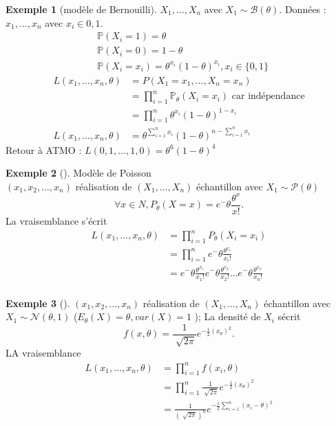 \documentclass{article}
\theoremstyle{plain}%
\theoremstyle{definition}
\newtheorem{exmp}{Exemple}[section]
\theoremstyle{remark}
\begin{document}
\begin{exmp}[modèle de Bernouilli]
    $ X_1, \dots, X_n $ avec $ X_1 \sim \mathcal{B}(\theta ) $. Données : $ x_1, \dots, x_n $ avec $ x_i \in {0,1} $. 
    \begin{align*}
        &\mathbb{P}(X_i=1) = \theta \\
        &\mathbb{P}(X_i=0) = 1-\theta \\
        &\mathbb{P}(X_i=x_i) = \theta^{x_i} (1-\theta)^{x_i}, x_i \in \{0,1\}
    \end{align*}
    \begin{align*}
        L(x_1, \dots, x_n, \theta ) &= P(X_1=x_1, \dots, X_n=x_n)\\
        &= \prod_{i=1}^{n}\mathbb{P}_\theta(X_i = x_i) \text{ car indépendance} \\
        &= \prod_{i=1}^{n}\theta ^{x_i} (1-\theta)^{1-x_i} \\
        L(x_1, \dots, x_n, \theta ) &= \theta ^{\sum_{i=1}^{n}x_i}(1-\theta )^{n-\sum_{i=1}^{n}x_i}
    \end{align*}
    Retour à ATMO : $ L(0,1,\dots,1,0) = \theta ^6 (1-\theta)^4 $ 
\end{exmp}
\begin{exmp}[]
    Modèle de Poisson \\
    $ (x_1,x_2,\dots,x_n) $ réalisation de $(X_1,\dots, X_n)$ échantillon avec $ X_1 \sim \mathcal{P}(\theta ) $ 
    \[
        \forall x \in N, P_\theta (X=x)= e^-\theta \frac{\theta ^x}{x!}
    .\]
    La vraisemblance s'écrit 
    \begin{align*}
        L(x_1, \dots, x_n, \theta ) &= \prod_{i=1}^{n}P_\theta (X_i = x_i) \\
        &= \prod_{i=1}^{n}e^-\theta \frac{\theta ^{x_i}}{x_i!} \\
        &= e^-\theta \frac{\theta ^{x_1}}{x_1!} e^-\theta \frac{\theta ^{x_2}}{x_2!} \dots e^-\theta \frac{\theta ^{x_n}}{x_n!} \\
    \end{align*}
\end{exmp}
\begin{exmp}[]
    $ (x_1,x_2,\dots,x_n) $ réalisation de $(X_1,\dots, X_n)$ échantillon avec $ X_1 \sim \mathcal{N}(\theta,1 ) $ ($ E_\theta (X) = \theta , var(X)=1 $ ); La densité de $ X_i $ sécrit 
    \[
        f(x, \theta )= \frac{1}{\sqrt[]{2 \pi }}e^{- \frac{1}{2}(x_\theta )^2}
    .\]
    LA vraisemblance \begin{align*}
        L(x_1, \dots, x_n, \theta ) &= \prod_{i=1}^{n} f(x_i, \theta ) \\
        &= \prod_{i=1}^{n} \frac{1}{\sqrt[]{2 \pi }}e^{- \frac{1}{2}(x_\theta )^2} \\
        &= \frac{1}{(\sqrt[]{2 \pi })^n}e^{-\frac{1}{2}\sum_{i=1}^{n}(x_i-\theta )^2}
    \end{align*}
\end{exmp}
\end{document}
